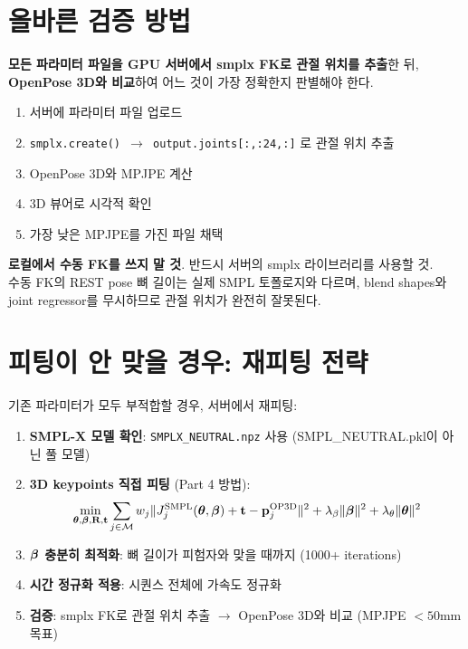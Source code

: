 \documentclass[11pt, a4paper]{report}
\begin{document}
\section{올바른 검증 방법}

\begin{keyidea}
\textbf{모든 파라미터 파일을 GPU 서버에서 smplx FK로 관절 위치를 추출}한 뒤,
\textbf{OpenPose 3D와 비교}하여 어느 것이 가장 정확한지 판별해야 한다.

\begin{enumerate}[nosep]
  \item 서버에 파라미터 파일 업로드
  \item \texttt{smplx.create() $\rightarrow$ output.joints[:,:24,:]} 로 관절 위치 추출
  \item OpenPose 3D와 MPJPE 계산
  \item 3D 뷰어로 시각적 확인
  \item 가장 낮은 MPJPE를 가진 파일 채택
\end{enumerate}
\end{keyidea}

\begin{warningbox}
\textbf{로컬에서 수동 FK를 쓰지 말 것}. 반드시 서버의 smplx 라이브러리를 사용할 것.\\
수동 FK의 REST pose 뼈 길이는 실제 SMPL 토폴로지와 다르며,
blend shapes와 joint regressor를 무시하므로 관절 위치가 완전히 잘못된다.
\end{warningbox}


\section{피팅이 안 맞을 경우: 재피팅 전략}

기존 파라미터가 모두 부적합할 경우, 서버에서 재피팅:

\begin{enumerate}[leftmargin=*]
  \item \textbf{SMPL-X 모델 확인}: \texttt{SMPLX\_NEUTRAL.npz} 사용 (SMPL\_NEUTRAL.pkl이 아닌 풀 모델)
  \item \textbf{3D keypoints 직접 피팅} (Part 4 방법):
  \begin{equation}
  \min_{\bm{\theta}, \bm{\beta}, \mathbf{R}, \mathbf{t}} \sum_{j \in \mathcal{M}} w_j \| J_j^{\text{SMPL}}(\bm{\theta}, \bm{\beta}) + \mathbf{t} - \mathbf{p}_j^{\text{OP3D}} \|^2 + \lambda_\beta \|\bm{\beta}\|^2 + \lambda_\theta \|\bm{\theta}\|^2
  \end{equation}
  \item \textbf{$\bm{\beta}$ 충분히 최적화}: 뼈 길이가 피험자와 맞을 때까지 (1000+ iterations)
  \item \textbf{시간 정규화 적용}: 시퀀스 전체에 가속도 정규화
  \item \textbf{검증}: smplx FK로 관절 위치 추출 $\rightarrow$ OpenPose 3D와 비교 (MPJPE $< 50$mm 목표)
\end{enumerate}
\end{document}
